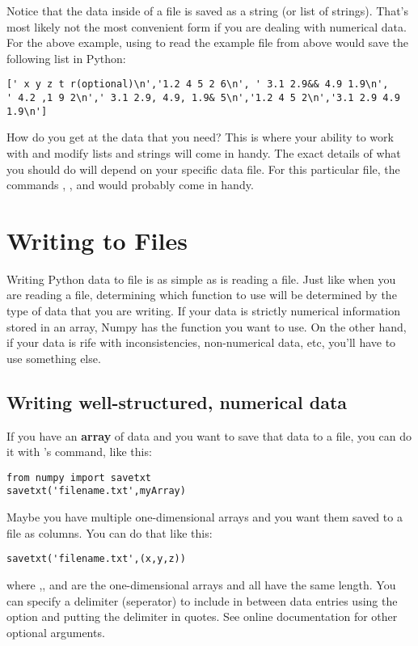 Notice that the data inside of a file is saved as a string (or list of
strings). That's most likely not the most convenient form if you are
dealing with numerical data.  For the above example, using
 to read the example file from above would save the
following list in Python:
\begin{Verbatim}
[' x y z t r(optional)\n','1.2 4 5 2 6\n', ' 3.1 2.9&& 4.9 1.9\n',
' 4.2 ,1 9 2\n',' 3.1 2.9, 4.9, 1.9& 5\n','1.2 4 5 2\n','3.1 2.9 4.9 1.9\n']
\end{Verbatim}
How do you get at the data that you need?  This is where your ability
to work with and modify lists and strings will come in handy.  The
exact details of what you should do will depend on your specific data
file.  For this particular file, the commands ,
, and  would probably come in handy.

\section{Writing to Files}
Writing Python data to file is as simple as is reading a file.  Just
like when you are reading a file, determining which function to use
will be determined by the type of data that you are writing.  If your
data is strictly numerical information stored in an array, Numpy has
the function you want to use.  On the other hand, if your data is rife
with inconsistencies, non-numerical data, etc, you'll have to use
something else.

\subsection*{Writing well-structured, numerical data}
If you have an {\bf array} of data and you want to save that data to a
file, you can do it with 's  command, like
this:
\begin{Verbatim}
from numpy import savetxt
savetxt('filename.txt',myArray)
\end{Verbatim}
Maybe you have multiple one-dimensional arrays and you want them saved
to a file as columns.  You can do that like this:
\begin{Verbatim}
savetxt('filename.txt',(x,y,z))
\end{Verbatim}
where ,, and  are the one-dimensional
arrays and all have the same length. You can specify a delimiter (seperator) to include in between
data entries using the  option and putting the
delimiter in quotes.  See online documentation for other optional
arguments.

